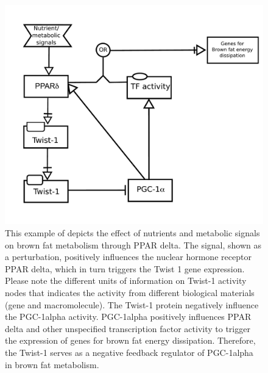 \begin{figure}[H]
\centering
\vspace*{-0.75em}
\includegraphics[scale=0.4]{examples/PPAR}
\caption{This example of \AF depicts the effect of nutrients and metabolic signals on brown fat metabolism through PPAR delta.  The signal, shown as a perturbation, positively influences the nuclear hormone receptor PPAR delta, which in turn triggers the Twist 1 gene expression.  Please note the different units of information on Twist-1 activity nodes that indicates the activity from different biological materials (gene and macromolecule).  The Twist-1 protein negatively influence the PGC-1alpha activity.  PGC-1alpha positively influences PPAR delta and other unspecified transcription factor activity to trigger the expression of genes for brown fat energy dissipation.  Therefore, the Twist-1 serves as a negative feedback regulator of PGC-1alpha in brown fat metabolism. }
\label{fig:af:1}
\end{figure}
